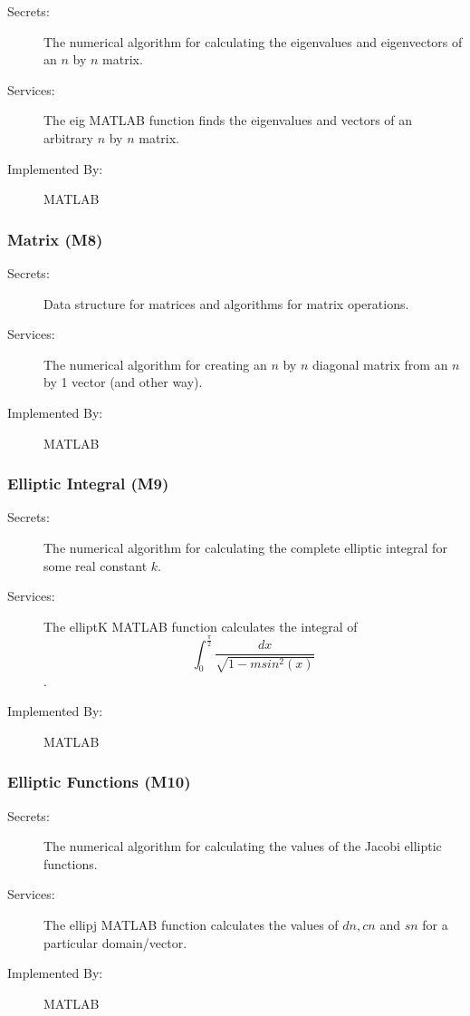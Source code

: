 \documentclass[12pt, titlepage]{article}
\begin{document}
	\begin{description}
		\item[Secrets:] The numerical algorithm for calculating the eigenvalues 
		and 
		eigenvectors of an 
		$n$ by $n$ matrix.
		\item[Services:] The eig MATLAB function finds the eigenvalues and 
		vectors 
		of an 
		arbitrary $n$ by $n$ matrix.
		\item[Implemented By:] MATLAB
	\end{description} 
	
	\subsubsection{ Matrix (M8)} \label{M8}
	
	\begin{description}
		\item[Secrets:] Data structure for matrices and algorithms for matrix 
		operations.
		\item[Services:] The numerical algorithm for creating an $n$ by $n$ 
		diagonal 
		matrix from an $n$ by 1 vector (and other way).
		\item[Implemented By:] MATLAB
	\end{description} 
	
	\subsubsection{Elliptic Integral (M9)} \label{M9}
	
	\begin{description}
		\item[Secrets:] The numerical algorithm for calculating the complete 
		elliptic integral for some real constant $k$. 
		\item[Services:] The elliptK MATLAB function calculates the integral of 
		$$ 
		\int_{0}^{\frac{\pi}{2}} \frac{dx}{\sqrt{1-msin^{2}(x)}}$$. \\ 
		\item[Implemented By:] MATLAB
	\end{description} 
	
	\subsubsection{Elliptic Functions (M10)} \label{M10}
	
	\begin{description}
		\item[Secrets:] The numerical algorithm for calculating the values of 
		the 
		Jacobi elliptic functions. 
		\item[Services:] The ellipj MATLAB function calculates the values of 
		$dn,cn$ 
		and $sn$ for a particular domain/vector. 
		\item[Implemented By:] MATLAB
	\end{description} 
	
\end{document}
